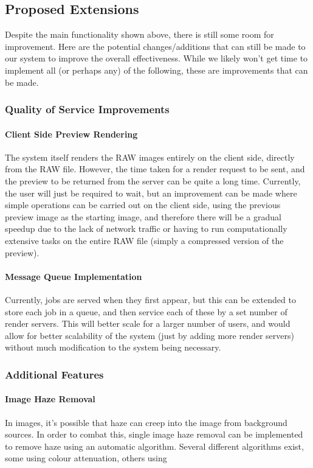 \documentclass[12pt,a4paper]{article}
\begin{document}
\subsection{Proposed Extensions}
Despite the main functionality shown above, there is still some room for improvement. Here are the potential
changes/additions that can still be made to our system to improve the overall effectiveness. While we likely won't
get time to implement all (or perhaps any) of the following, these are improvements that can be made.

\subsubsection{Quality of Service Improvements}
\paragraph{Client Side Preview Rendering}
The system itself renders the RAW images entirely on the client side,
directly from the RAW file. However, the time taken for a render request to be sent,
and the preview to be returned from the server can be quite a long time. Currently,
the user will just be required to wait, but an improvement can be made where simple operations can be carried out on the client side, using the previous preview image as
the starting image, and therefore there will be a gradual speedup due to the lack of network traffic or having to run computationally extensive tasks on the entire RAW file (simply a compressed version of the preview).

\paragraph{Message Queue Implementation}
Currently, jobs are served when they first appear, but this can be extended to store each job
in a queue, and then service each of these by a set number of render servers. This will better scale for
a larger number of users, and would allow for better scalability of the system (just by adding more render servers) without
much modification to the system being necessary.

\subsubsection{Additional Features}
\paragraph{Image Haze Removal}
In images, it's possible that haze can creep into the image from background sources.
In order to combat this, single image haze removal can be implemented to remove haze using an automatic algorithm.
Several different algorithms exist, some using colour attenuation, others using
\end{document}
